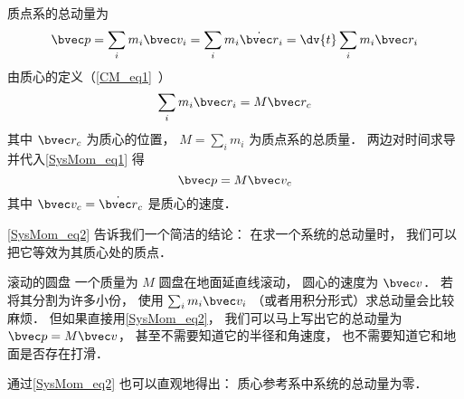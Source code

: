 

质点系的总动量为
\begin{equation}\label{SysMom_eq1}
\bvec p = \sum_i m_i \bvec v_i = \sum_i m_i \dot{\bvec r}_i = \dv{t}  \sum_i m_i \bvec r_i
\end{equation}
由质心的定义（\autoref{CM_eq1}~） 
\begin{equation}
\sum_i m_i \bvec r_i = M \bvec r_c
\end{equation}
其中 $\bvec r_c$ 为质心的位置， $M = \sum_i m_i$ 为质点系的总质量． 两边对时间求导并代入\autoref{SysMom_eq1} 得
\begin{equation}\label{SysMom_eq2}
\bvec p = M\bvec v_c
\end{equation}
其中 $\bvec v_c = \dot{\bvec r}_c$ 是质心的速度．

\autoref{SysMom_eq2} 告诉我们一个简洁的结论： 在求一个系统的总动量时， 我们可以把它等效为其质心处的质点．

\begin{example}{滚动的圆盘}
一个质量为 $M$ 圆盘在地面延直线滚动， 圆心的速度为 $\bvec v$． 若将其分割为许多小份， 使用 $\sum_i m_i \bvec v_i$ （或者用积分形式）求总动量会比较麻烦． 但如果直接用\autoref{SysMom_eq2}， 我们可以马上写出它的总动量为 $\bvec p = M\bvec v$， 甚至不需要知道它的半径和角速度， 也不需要知道它和地面是否存在打滑．
\end{example}

通过\autoref{SysMom_eq2} 也可以直观地得出： 质心参考系中系统的总动量为零．
